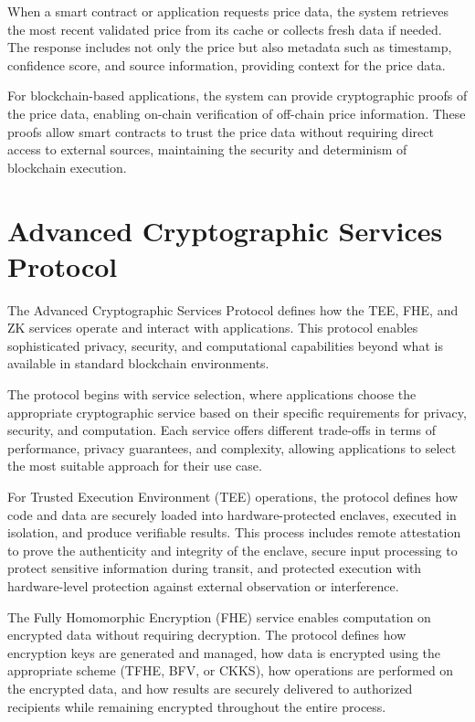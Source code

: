 \documentclass[11pt]{article}
\begin{document}
When a smart contract or application requests price data, the system retrieves the most recent validated price from its cache or collects fresh data if needed. The response includes not only the price but also metadata such as timestamp, confidence score, and source information, providing context for the price data.

For blockchain-based applications, the system can provide cryptographic proofs of the price data, enabling on-chain verification of off-chain price information. These proofs allow smart contracts to trust the price data without requiring direct access to external sources, maintaining the security and determinism of blockchain execution.

\section{Advanced Cryptographic Services Protocol}
\label{subsec:advanced-crypto-protocol-spec}

The Advanced Cryptographic Services Protocol defines how the TEE, FHE, and ZK services operate and interact with applications. This protocol enables sophisticated privacy, security, and computational capabilities beyond what is available in standard blockchain environments.


The protocol begins with service selection, where applications choose the appropriate cryptographic service based on their specific requirements for privacy, security, and computation. Each service offers different trade-offs in terms of performance, privacy guarantees, and complexity, allowing applications to select the most suitable approach for their use case.

For Trusted Execution Environment (TEE) operations, the protocol defines how code and data are securely loaded into hardware-protected enclaves, executed in isolation, and produce verifiable results. This process includes remote attestation to prove the authenticity and integrity of the enclave, secure input processing to protect sensitive information during transit, and protected execution with hardware-level protection against external observation or interference.

The Fully Homomorphic Encryption (FHE) service enables computation on encrypted data without requiring decryption. The protocol defines how encryption keys are generated and managed, how data is encrypted using the appropriate scheme (TFHE, BFV, or CKKS), how operations are performed on the encrypted data, and how results are securely delivered to authorized recipients while remaining encrypted throughout the entire process.
\end{document}
